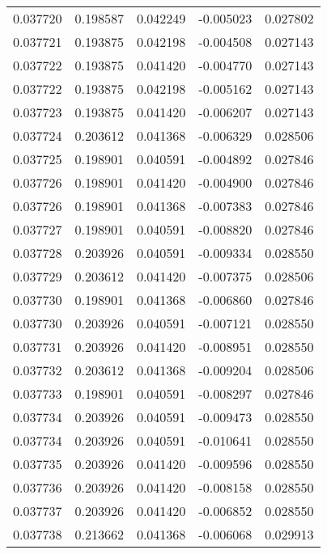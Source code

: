 \begin{tabular}{lrrrr}
0.037720    &  0.198587 &  0.042249 & -0.005023 &             0.027802 \\
0.037721    &  0.193875 &  0.042198 & -0.004508 &             0.027143 \\
0.037722    &  0.193875 &  0.041420 & -0.004770 &             0.027143 \\
0.037722    &  0.193875 &  0.042198 & -0.005162 &             0.027143 \\
0.037723    &  0.193875 &  0.041420 & -0.006207 &             0.027143 \\
0.037724    &  0.203612 &  0.041368 & -0.006329 &             0.028506 \\
0.037725    &  0.198901 &  0.040591 & -0.004892 &             0.027846 \\
0.037726    &  0.198901 &  0.041420 & -0.004900 &             0.027846 \\
0.037726    &  0.198901 &  0.041368 & -0.007383 &             0.027846 \\
0.037727    &  0.198901 &  0.040591 & -0.008820 &             0.027846 \\
0.037728    &  0.203926 &  0.040591 & -0.009334 &             0.028550 \\
0.037729    &  0.203612 &  0.041420 & -0.007375 &             0.028506 \\
0.037730    &  0.198901 &  0.041368 & -0.006860 &             0.027846 \\
0.037730    &  0.203926 &  0.040591 & -0.007121 &             0.028550 \\
0.037731    &  0.203926 &  0.041420 & -0.008951 &             0.028550 \\
0.037732    &  0.203612 &  0.041368 & -0.009204 &             0.028506 \\
0.037733    &  0.198901 &  0.040591 & -0.008297 &             0.027846 \\
0.037734    &  0.203926 &  0.040591 & -0.009473 &             0.028550 \\
0.037734    &  0.203926 &  0.040591 & -0.010641 &             0.028550 \\
0.037735    &  0.203926 &  0.041420 & -0.009596 &             0.028550 \\
0.037736    &  0.203926 &  0.041420 & -0.008158 &             0.028550 \\
0.037737    &  0.203926 &  0.041420 & -0.006852 &             0.028550 \\
0.037738    &  0.213662 &  0.041368 & -0.006068 &             0.029913 \\

\end{tabular}
